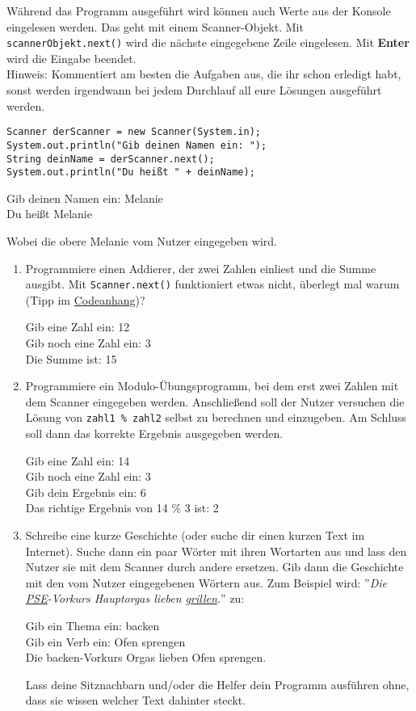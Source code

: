 \documentclass{../../sheet}
\begin{document}
\newpage
{}
Während das Programm ausgeführt wird können auch Werte aus der Konsole eingelesen werden. Das geht mit einem Scanner-Objekt. Mit \texttt{scannerObjekt.next()} wird die nächste eingegebene Zeile eingelesen. Mit \textbf{Enter} wird die Eingabe beendet.\\
Hinweis: Kommentiert am besten die Aufgaben aus, die ihr schon erledigt habt, sonst werden irgendwann bei jedem Durchlauf all eure Lösungen ausgeführt werden.
\begin{verbatim}
Scanner derScanner = new Scanner(System.in);
System.out.println("Gib deinen Namen ein: ");
String deinName = derScanner.next();
System.out.println("Du heißt " + deinName);
\end{verbatim}
\begin{ausgabe}
  Gib deinen Namen ein: Melanie\\
  Du heißt Melanie
\end{ausgabe}
Wobei die obere Melanie vom Nutzer eingegeben wird.

\begin{enumerate}
    \item Programmiere einen Addierer, der zwei Zahlen einliest und die Summe ausgibt. Mit \texttt{Scanner.next()} funktioniert etwas nicht, überlegt mal warum (Tipp im \hyperlink{Aufgabe_2.1}{Codeanhang})?
\begin{ausgabe}
Gib eine Zahl ein: 12\\
Gib noch eine Zahl ein: 3\\
Die Summe ist: 15
\end{ausgabe}
    \item Programmiere ein Modulo-Übungsprogramm, bei dem erst zwei Zahlen mit dem Scanner eingegeben werden. Anschließend soll der Nutzer versuchen die Lösung von \texttt{zahl1 \% zahl2} selbst zu berechnen und einzugeben. Am Schluss soll dann das korrekte Ergebnis ausgegeben werden.
\begin{ausgabe}
Gib eine Zahl ein: 14\\
Gib noch eine Zahl ein: 3\\
Gib dein Ergebnis ein: 6\\
Das richtige Ergebnis von 14 \% 3 ist: 2
\end{ausgabe}
    \item Schreibe eine kurze Geschichte (oder suche dir einen kurzen Text im Internet). Suche dann ein paar Wörter mit ihren Wortarten aus und lass den Nutzer sie mit dem Scanner durch andere ersetzen. Gib dann die Geschichte mit den vom Nutzer eingegebenen Wörtern aus. Zum Beispiel wird: ''\textit{Die \underline{PSE}-Vorkurs Hauptorgas lieben \underline{grillen}.}'' \space zu:
          \begin{ausgabe}
              Gib ein Thema ein: backen\\
              Gib ein Verb ein: Ofen sprengen\\
              Die backen-Vorkurs Orgas lieben Ofen sprengen.
          \end{ausgabe}
          Lass deine Sitznachbarn und/oder die Helfer dein Programm ausführen ohne, dass sie wissen welcher Text dahinter steckt.
\end{enumerate}
\end{document}
